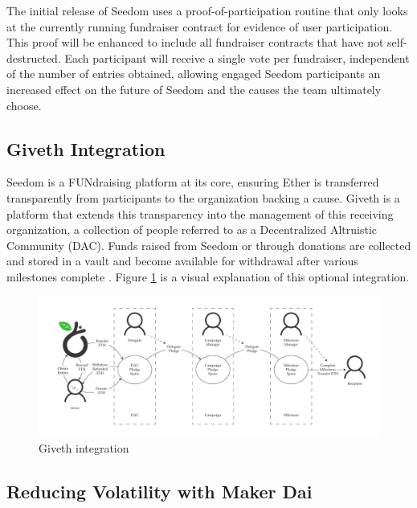 \documentclass[11pt]{article}
\begin{document}
The initial release of Seedom uses a proof-of-participation routine that only looks at the currently running fundraiser contract for evidence of user participation. This proof will be enhanced to include all fundraiser contracts that have not self-destructed. Each participant will receive a single vote per fundraiser, independent of the number of entries obtained, allowing engaged Seedom participants an increased effect on the future of Seedom and the causes the team ultimately choose.

\subsection{Giveth Integration}

Seedom is a FUNdraising platform at its core, ensuring Ether is transferred transparently from participants to the organization backing a cause. Giveth is a platform that extends this transparency into the management of this receiving organization, a collection of people referred to as a Decentralized Altruistic Community (DAC). Funds raised from Seedom or through donations are collected and stored in a vault and become available for withdrawal after various milestones complete \cite{11}. Figure \ref{figure:givethIntegration} is a visual explanation of this optional integration.

\begin{figure}[H]
\begin{center}
\includegraphics[width=1.0\textwidth]{./graphics/giveth-integration.pdf}
\caption{Giveth integration \cite{11}}
\label{figure:givethIntegration}
\end{center}
\end{figure}

\subsection{Reducing Volatility with Maker Dai}
\end{document}
